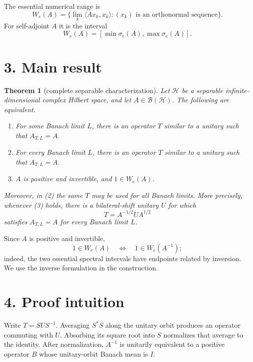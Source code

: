 \documentclass[11pt]{article}
\newtheorem{theorem}{Theorem}
\newcommand{\B}{\mathcal B}
\newcommand{\Hh}{\mathcal H}
\newcommand{\We}{W_{\!e}}
\begin{document}
The essential numerical range is
\[
 \We(A)=\{\lim_k\langle Ax_k,x_k\rangle:
 (x_k)\text{ is an orthonormal sequence}\}.
\]
For self-adjoint $A$ it is the interval
\begin{equation}\label{eq:We}
 \We(A)=[\min\sigma_e(A),\max\sigma_e(A)].
\end{equation}

\section*{3. Main result}

\begin{theorem}[complete separable characterization]\label{thm:main}
Let $\Hh$ be a separable infinite-dimensional complex Hilbert space, and let $A\in\B(\Hh)$.  The following are equivalent.
\begin{enumerate}
\item For some Banach limit $L$, there is an operator $T$ similar to a unitary such that $A_{T,L}=A$.
\item For every Banach limit $L$, there is an operator $T$ similar to a unitary such that $A_{T,L}=A$.
\item $A$ is positive and invertible, and $1\in\We(A)$.
\end{enumerate}
Moreover, in (2) the same $T$ may be used for all Banach limits.  More precisely, whenever (3) holds, there is a bilateral-shift unitary $U$ for which
\begin{equation}\label{eq:constructT}
 T=A^{-1/2}UA^{1/2}
\end{equation}
satisfies $A_{T,L}=A$ for every Banach limit $L$.
\end{theorem}

Since $A$ is positive and invertible,
\[
 1\in\We(A)\quad\Longleftrightarrow\quad 1\in\We(A^{-1});
\]
indeed, the two essential spectral intervals have endpoints related by inversion.  We use the inverse formulation in the construction.

\section*{4. Proof intuition}

Write $T=SUS^{-1}$.  Averaging $S^*S$ along the unitary orbit produces an operator commuting with $U$.  Absorbing its square root into $S$ normalizes that average to the identity.  After normalization, $A^{-1}$ is unitarily equivalent to a positive operator $B$ whose unitary-orbit Banach mean is $I$.
\end{document}
